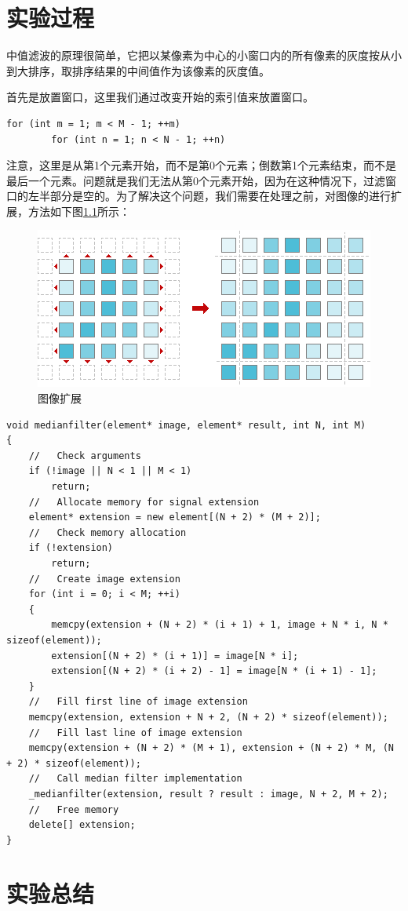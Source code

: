 \documentclass[a4paper]{ctexrep}
\begin{document}
\chapter{实验过程}

中值滤波的原理很简单，它把以某像素为中心的小窗口内的所有像素的灰度按从小到大排序，取排序结果的中间值作为该像素的灰度值。

首先是放置窗口，这里我们通过改变开始的索引值来放置窗口。

\begin{lstlisting}
for (int m = 1; m < M - 1; ++m)
		for (int n = 1; n < N - 1; ++n)
\end{lstlisting}

注意，这里是从第1个元素开始，而不是第0个元素；倒数第1个元素结束，而不是最后一个元素。问题就是我们无法从第0个元素开始，因为在这种情况下，过滤窗口的左半部分是空的。为了解决这个问题，我们需要在处理之前，对图像的进行扩展，方法如下图\ref {fig:imgExt}所示：
\begin{figure}
\centering
\includegraphics{img/extendImg.png}
\caption{图像扩展}
\label{fig:imgExt}
\end{figure}

\begin{lstlisting}
void medianfilter(element* image, element* result, int N, int M)
{
	//   Check arguments
	if (!image || N < 1 || M < 1)
		return;
	//   Allocate memory for signal extension
	element* extension = new element[(N + 2) * (M + 2)];
	//   Check memory allocation
	if (!extension)
		return;
	//   Create image extension
	for (int i = 0; i < M; ++i)
	{
		memcpy(extension + (N + 2) * (i + 1) + 1, image + N * i, N * sizeof(element));
		extension[(N + 2) * (i + 1)] = image[N * i];
		extension[(N + 2) * (i + 2) - 1] = image[N * (i + 1) - 1];
	}
	//   Fill first line of image extension
	memcpy(extension, extension + N + 2, (N + 2) * sizeof(element));
	//   Fill last line of image extension
	memcpy(extension + (N + 2) * (M + 1), extension + (N + 2) * M, (N + 2) * sizeof(element));
	//   Call median filter implementation
	_medianfilter(extension, result ? result : image, N + 2, M + 2);
	//   Free memory
	delete[] extension;
}
\end{lstlisting}
\chapter{实验总结}
\end{document}
